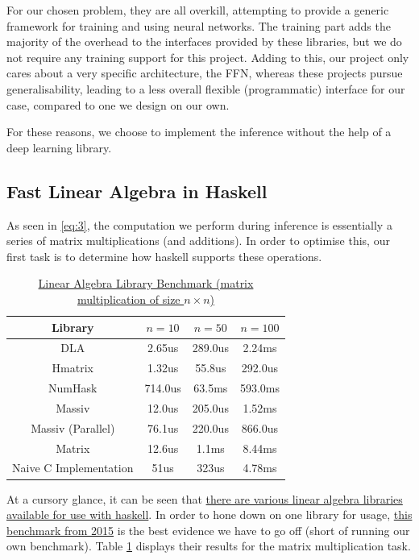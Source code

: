 \documentclass[12pt, titlepage]{article}
\begin{document}
For our chosen problem, they are all overkill, attempting to provide a generic framework for training and using neural networks. The training part adds the majority of the overhead to the interfaces provided by these libraries, but we do not require any training support for this project. Adding to this, our project only cares about a very specific architecture, the FFN, whereas these projects pursue generalisability, leading to a less overall flexible (programmatic) interface for our case, compared to one we design on our own.\bigskip

For these reasons, we choose to implement the inference without the help of a deep learning library.

\subsection{Fast Linear Algebra in Haskell}
As seen in \eqref{eq:3}, the computation we perform during inference is essentially a series of matrix multiplications (and additions). In order to optimise this, our first task is to determine how haskell supports these operations.\bigskip

\begin{table}
	\centering \begin{tabular}{|c|c|c|c|}
		\hline \textbf{Library} & $n = 10$ & $n = 50$ & $n = 100$\\
		\hline DLA & 2.65us & 289.0us & 2.24ms\\
		\hline Hmatrix & 1.32us & 55.8us & 292.0us\\
		\hline NumHask & 714.0us & 63.5ms & 593.0ms\\
		\hline Massiv & 12.0us & 205.0us & 1.52ms\\
		\hline Massiv (Parallel) & 76.1us & 220.0us & 866.0us\\
		\hline Matrix & 12.6us & 1.1ms & 8.44ms\\
		\hline Naive C Implementation & 51us & 323us & 4.78ms\\
		\hline
	\end{tabular}
	\caption{\label{tab:1} \href{https://github.com/Magalame/fastest-matrices}{Linear Algebra Library Benchmark (matrix multiplication of size $n \times n$)}}
\end{table}
At a cursory glance, it can be seen that \href{https://wiki.haskell.org/Applications_and_libraries/Mathematics#Linear_algebra}{there are various linear algebra libraries available for use with haskell}. In order to hone down on one library for usage, \href{https://github.com/Magalame/fastest-matrices}{this benchmark from 2015} is the best evidence we have to go off (short of running our own benchmark). Table \ref{tab:1} displays their results for the matrix multiplication task.\bigskip
\end{document}
